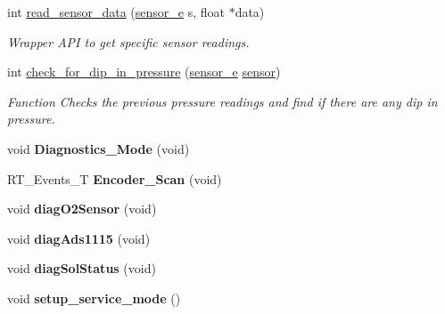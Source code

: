 \begin{DoxyCompactItemize}
int \hyperlink{group___ventilator_module_ga35a8f7056ae3545cbb3a69e993147fb3}{read\+\_\+sensor\+\_\+data} (\hyperlink{group___base_sensors_module_ga241bbfb8b20d2f411c4c10bb9703288c}{sensor\+\_\+e} s, float $\ast$data)
\begin{DoxyCompactList}\small\item\em Wrapper A\+PI to get specific sensor readings. \end{DoxyCompactList}\item 
int \hyperlink{group___ventilator_module_gad44ae3ff179318970b2a99be7500db74}{check\+\_\+for\+\_\+dip\+\_\+in\+\_\+pressure} (\hyperlink{group___base_sensors_module_ga241bbfb8b20d2f411c4c10bb9703288c}{sensor\+\_\+e} \hyperlink{classsensor}{sensor})
\begin{DoxyCompactList}\small\item\em Function Checks the previous pressure readings and find if there are any dip in pressure. \end{DoxyCompactList}\item 
\mbox{\label{group___ventilator_module_gad3872e1e471ed65880a4af46a7da3f04}} 
void {\bfseries Diagnostics\+\_\+\+Mode} (void)
\item 
\mbox{\label{group___ventilator_module_ga3e384acb2fe36c218e7756c2b76e7086}} 
R\+T\+\_\+\+Events\+\_\+T {\bfseries Encoder\+\_\+\+Scan} (void)
\item 
\mbox{\label{group___ventilator_module_ga9e5deb168b1b08c02c3c84db7f605678}} 
void {\bfseries diag\+O2\+Sensor} (void)
\item 
\mbox{\label{group___ventilator_module_ga9de35e7db8fa02727ff68d17d6691f94}} 
void {\bfseries diag\+Ads1115} (void)
\item 
\mbox{\label{group___ventilator_module_gae5fda696ed3670a85a02ab2c253b1aec}} 
void {\bfseries diag\+Sol\+Status} (void)
\item 
\mbox{\label{group___ventilator_module_gabd908c81d93fb8bb1cceb31e9fe6cefc}} 
void {\bfseries setup\+\_\+service\+\_\+mode} ()
\item 
\mbox{\label{group___ventilator_module_ga1556b5da7cefd352cde4ad052ee0d7a8}} 

\end{DoxyCompactItemize}
